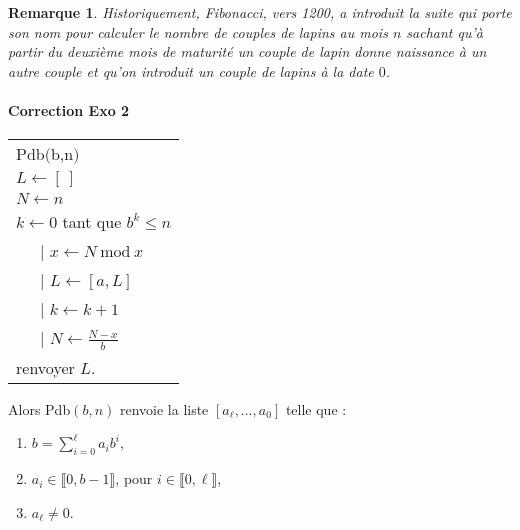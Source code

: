 \documentclass[11pt,a4paper]{article}
\newtheorem*{rem}{Remarque}
\begin{document}
\begin{rem}
Historiquement, Fibonacci, vers 1200, a introduit la suite qui porte son nom pour calculer le nombre de couples de lapins au mois $n$ sachant qu'à partir du deuxième mois de maturité un couple de lapin donne naissance à un autre couple et qu'on introduit un couple de lapins à la date $0$. 
\end{rem}

\paragraph{Correction Exo 2}




\begin{center}
\begin{tabular}{l}
Pdb$($b,n$)$\\
$ L \leftarrow [\ ]$ \\
$N \leftarrow n$ \\
$k\leftarrow 0$
tant que $b^k\leq n$ \\
\ \ \ {\rm |} $x \leftarrow N \mathrm{\ mod\ }x$ \\
\ \ \ {\rm |}   $L\leftarrow [a,L]$ \\
\ \ \ {\rm |}   $k\leftarrow k+1$ \\ 
\ \ \ {\rm |}   $N\leftarrow \frac{N-x}{b}$ \\ 
renvoyer $L$.
\end{tabular}
\end{center}

Alors Pdb$(b,n)$ renvoie la liste $[a_\ell,\ldots,a_0]$ telle que :\begin{enumerate}
\item $b=\sum_{i=0}^\ell a_i b^i$,

\item $a_i\in \llbracket 0,b-1\rrbracket$, pour $i\in \llbracket 0,\ell\rrbracket$,

\item $a_\ell\neq 0$.
\end{enumerate}
\end{document}
